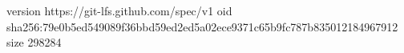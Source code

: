 version https://git-lfs.github.com/spec/v1
oid sha256:79e0b5ed549089f36bbd59ed2ed5a02ece9371c65b9fc787b835012184967912
size 298284

